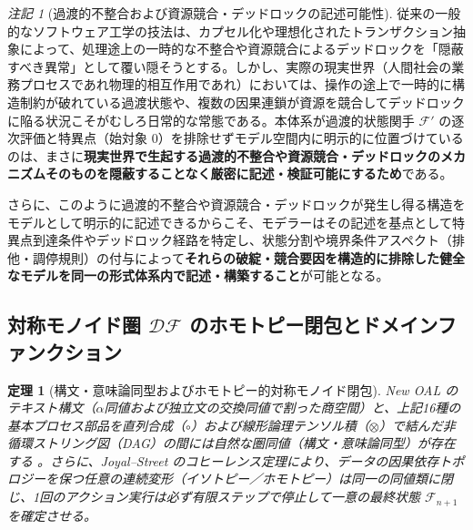 \documentclass[11pt,a4paper]{ltjsarticle}
\theoremstyle{definition}
\theoremstyle{plain}
\newtheorem{theorem}{定理}[section]
\theoremstyle{remark}
\newtheorem{remark}{注記}[section]
\newcommand{\DF}{\mathcal{DF}}
\begin{document}
\begin{remark}[過渡的不整合および資源競合・デッドロックの記述可能性]\label{rem:deadlocks}
従来の一般的なソフトウェア工学の技法は、カプセル化や理想化されたトランザクション抽象によって、処理途上の一時的な不整合や資源競合によるデッドロックを「隠蔽すべき異常」として覆い隠そうとする。しかし、実際の現実世界（人間社会の業務プロセスであれ物理的相互作用であれ）においては、操作の途上で一時的に構造制約が破れている過渡状態や、複数の因果連鎖が資源を競合してデッドロックに陥る状況こそがむしろ日常的な常態である。本体系が過渡的状態関手 $\mathcal{F}'$ の逐次評価と特異点（始対象 $0$）を排除せずモデル空間内に明示的に位置づけているのは、まさに\textbf{現実世界で生起する過渡的不整合や資源競合・デッドロックのメカニズムそのものを隠蔽することなく厳密に記述・検証可能にするため}である。

さらに、このように過渡的不整合や資源競合・デッドロックが発生し得る構造をモデルとして明示的に記述できるからこそ、モデラーはその記述を基点として特異点到達条件やデッドロック経路を特定し、状態分割や境界条件アスペクト（排他・調停規則）の付与によって\textbf{それらの破綻・競合要因を構造的に排除した健全なモデルを同一の形式体系内で記述・構築すること}が可能となる。
\end{remark}

\subsection{対称モノイド圏 $\DF$ のホモトピー閉包とドメインファンクション}

\begin{theorem}[構文・意味論同型およびホモトピー的対称モノイド閉包]\label{thm:monoidal-closure}
New OAL のテキスト構文（$\alpha$同値および独立文の交換同値で割った商空間）と、上記16種の基本プロセス部品を直列合成（$\circ$）および線形論理テンソル積（$\otimes$）で結んだ非循環ストリング図（DAG）の間には自然な圏同値（構文・意味論同型）が存在する \cite{joyal1991,coecke2017}。さらに、Joyal--Street のコヒーレンス定理により、データの因果依存トポロジーを保つ任意の連続変形（イソトピー／ホモトピー）は同一の同値類に閉じ、1回のアクション実行は必ず有限ステップで停止して一意の最終状態 $\mathcal{F}_{n+1}$ を確定させる。
\end{theorem}
\end{document}
